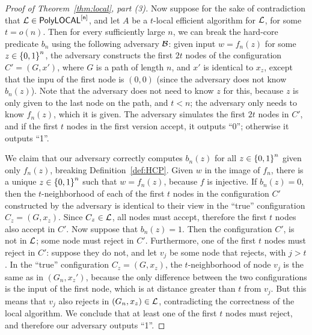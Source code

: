 \begin{proof}[Proof of Theorem~\ref{thm:local}, part (3)]
	Now suppose for the sake of contradiction that $\mathcal{L} \in \mathsf{PolyLOCAL}^{[\mathsf{n}]}$,
	and let $A$ be a $t$-local efficient algorithm for $\mathcal{L}$, for some $t = o(n)$.
	Then for every sufficiently large $n$, 
	we can break the hard-core predicate $b_n$ using the following adversary $\mathcal{B}$:
	given input $w = f_n(z)$ for some $z \in \left \{{0,1} \right \}^n$,
	the adversary constructs the first $2t$ nodes of the configuration $C' = (G, x')$,
	where $G$ is a path of length $n$,
	and $x'$ is identical to $x_z$,
	except that the inpu of the first node is $(0, 0)$ (since the adversary does not know $b_n(z)$).
	Note that the adversary does not need to know $z$ for this, because $z$ is only given to the last node
	on the path, and $t < n$; the adversary only needs to know $f_n(z)$, which it is given.
	The adversary simulates the first $2t$ nodes in $C'$,
	and
	if the first $t$ nodes in the first version accept, it outputs ``0'';
	otherwise it outputs ``1''.

	We claim that our adversary correctly computes $b_n(z)$ for all $z \in \left \{{0,1} \right \}^n$
	given only $f_n(z)$,
	breaking Definition~\ref{def:HCP}.
	Given $w$
	in the image of $f_n$, there is a unique $z \in \left \{{0,1} \right \}^n$ such that $w = f_n(z)$, because $f$ is injective.
	If $b_n(z) = 0$,
	then the $t$-neighborhood
	of each of the first $t$ nodes in the configuration $C'$ constructed by the adversary is identical
	to their view in the ``true'' configuration $C_z = (G, x_z)$.
	Since $C_z \in \mathcal{L}$, all nodes must accept,
	therefore the first $t$ nodes also accept in $C'$.
	Now suppose that $b_n(z) = 1$.
	Then the configuration $C'$,
	is not in $\mathcal{L}$; some node must reject in $C'$.
	Furthermore, one of the first $t$ nodes must reject in $C'$:
	suppose they do not, and let $v_j$ be some node that rejects, with $j > t$.
	In the ``true'' configuration $C_z = (G, x_z)$, the $t$-neighborhood of node $v_j$
	is the same as in $(G_n, x_z')$, because the only difference between the two configurations is the input
	of the first node, which is at distance greater than $t$ from $v_j$.
	But this means that $v_j$ also rejects in $(G_n, x_z) \in \mathcal{L}$, contradicting the correctness of the local algorithm.
	We conclude that at least one of the first $t$ nodes must reject, and therefore our adversary outputs ``1''.
\end{proof}
